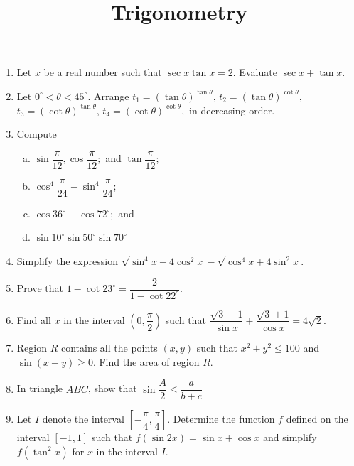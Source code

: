 \documentclass[12pt]{scrartcl}
\begin{document}
\title{Trigonometry}
\maketitle

\renewcommand*\contentsname{Daftar Isi}
\tableofcontents

\newpage

\begin{enumerate}
    \item Let $x$ be a real number such that $\sec x \tan x = 2$. Evaluate $\sec x + \tan x.$
    
    \item Let $0^{\circ}<\theta<45^{\circ}$. Arrange $t_{1}=(\tan \theta)^{\tan \theta}$, $t_{2}=(\tan \theta)^{\cot \theta}$, $t_{3}=(\cot \theta)^{\tan \theta}$, $t_{4}=(\cot \theta)^{\cot \theta},$ in decreasing order.
    
    \item Compute 
    \begin{enumerate}[(a)]
        \item $\sin\dfrac{\pi}{12},\cos\dfrac{\pi}{12};$ and $\tan\dfrac{\pi}{12}$; 
        \item $\cos^{4}\dfrac{\pi}{24}-\sin^{4}\dfrac{\pi}{24}$; 
        \item $\cos 36^{\circ}-\cos 72^{\circ};$ and 
        \item $\sin 10^{\circ}\sin 50^{\circ}\sin 70^{\circ}$
    \end{enumerate}
    
    \item Simplify the expression $\sqrt{\sin^{4}x+4 \cos^{2}x}-\sqrt{\cos^{4}x+4 \sin^{2}x}$.
    
    \item Prove that $1-\cot 23^{\circ}=\dfrac{2}{1-\cot 22^{\circ}}.$
    
    \item Find all $x$ in the interval $(0,\dfrac{\pi}{2})$ such that $\dfrac{\sqrt{3}-1}{\sin x}+\dfrac{\sqrt{3}+1}{\cos x}=4\sqrt{2}.$
    
    \item Region $R$ contains all the points $(x, y)$ such that $x^{2}+y^{2}\le100$ and $\sin(x+y)\ge0$. Find the area of region $R$.
    
    \item In triangle $ABC$, show that $\sin\dfrac{A}{2}\le\dfrac{a}{b+c}$
    
    \item Let $I$ denote the interval $[-\dfrac{\pi}{4},\dfrac{\pi}{4}]$. Determine the function $f$ defined on the interval $[-1, 1]$ such that $f(\sin 2x)=\sin x+\cos x$ and simplify $f(\tan^{2}x)$ for $x$ in the interval $I$.
    

\end{enumerate}
\end{document}
